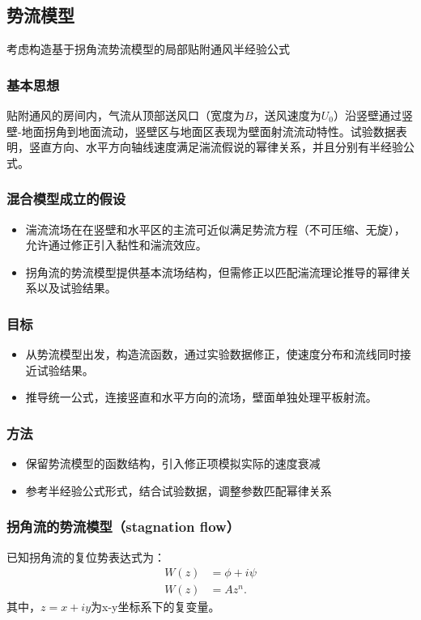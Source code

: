 
\subsection{势流模型}

考虑构造基于拐角流势流模型的局部贴附通风半经验公式

\subsubsection{基本思想}
贴附通风的房间内，气流从顶部送风口（宽度为$B$，送风速度为$U_{0}$）沿竖壁通过竖壁-地面拐角到地面流动，竖壁区与地面区表现为壁面射流流动特性。试验数据表明，竖直方向、水平方向轴线速度满足湍流假说的幂律关系，并且分别有半经验公式。
\subsubsection{混合模型成立的假设}
\begin{itemize}
    \item 湍流流场在在竖壁和水平区的主流可近似满足势流方程（不可压缩、无旋），允许通过修正引入黏性和湍流效应。
    \item 拐角流的势流模型提供基本流场结构，但需修正以匹配湍流理论推导的幂律关系以及试验结果。
\end{itemize}
\subsubsection{目标}
\begin{itemize}
    \item 从势流模型出发，构造流函数，通过实验数据修正，使速度分布和流线同时接近试验结果。
    \item 推导统一公式，连接竖直和水平方向的流场，壁面单独处理平板射流。
\end{itemize}
\subsubsection{方法}
\begin{itemize}
    \item 保留势流模型的函数结构，引入修正项模拟实际的速度衰减
    \item 参考半经验公式形式，结合试验数据，调整参数匹配幂律关系
\end{itemize}


\subsubsection{拐角流的势流模型（stagnation flow）}
已知拐角流的复位势表达式为：
\begin{align}
            \label{eq:example}
          W(z) &= \phi + i \psi \\
          W(z) &= Az^{n}.
\end{align}
其中，$z=x+iy$为x-y坐标系下的复变量。

